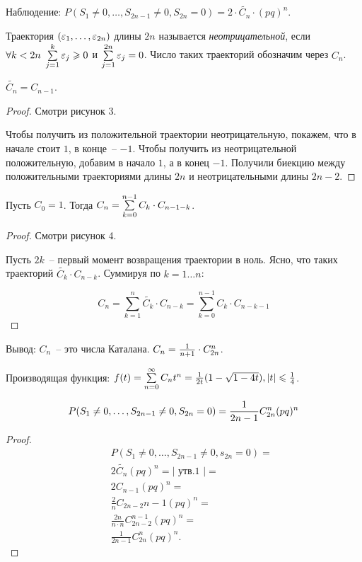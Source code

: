 \begin{statement}
Наблюдение: $P(S_1 \neq 0, \dots, S_{2n-1} \neq 0, S_{2n} = 0) = 2 \cdot \tilde{C_n} \cdot (pq)^n$. 
\end{statement}

\begin{definition}
Траектория $(\varepsilon_1, \dots, \varepsilon_{2n})$ длины $2n$ называется
\emph{неотрицательной}, если
$\forall k < 2n~\sum\limits_{j=1}^k \varepsilon_j \geqslant 0$ и $\sum\limits_{j=1}^{2n} \varepsilon_j = 0$.
Число таких траекторий обозначим через $C_n$.
\end{definition}

\begin{statement}
$\tilde{C_n} = C_{n-1}$.
\end{statement}
\begin{proof}
Смотри рисунок 3.

Чтобы получить из положительной траектории неотрицательную, покажем,
что в начале стоит $1$, в конце~-- $-1$. Чтобы получить из неотрицательной положительную,
добавим в начало $1$, а в конец $-1$. Получили биекцию между положительными траекториями длины $2n$
и неотрицательными длины $2n-2$.
\end{proof}

\begin{statement}
Пусть $C_0 = 1$. Тогда $C_n = \sum\limits_{k=0}^{n-1} C_k \cdot C_{n-1-k}$.
\end{statement}
\begin{proof}
Смотри рисунок 4.

Пусть $2k$~-- первый момент возвращения траектории в ноль.
Ясно, что таких траекторий $\tilde{C_k} \cdot C_{n-k}$. Суммируя по $k=1\dots n$:

$$C_n = \sum_{k=1}^n \tilde{C_k} \cdot C_{n-k} = \sum_{k=0}^{n-1} C_k \cdot C_{n-k-1}$$
\end{proof}

Вывод: $C_n$~-- это числа Каталана. $C_n =\frac{1}{n+1} \cdot C_{2n}^{n}$.

Производящая функция: $f(t) = \sum\limits_{n=0}^{\infty} C_n t^n = \frac{1}{2t}(1-\sqrt{1-4t}), |t| \leqslant \frac14$.

\begin{theorem}
$$P(S_1 \neq 0, \dots, S_{2n-1} \neq 0, S_{2n} = 0) = \frac{1}{2n-1}C_{2n}^{n}(pq)^n$$
\end{theorem}
\begin{proof}
\begin{eqnarray*}
&&P(S_1 \neq 0, \dots, S_{2n-1} \neq 0 , s_{2n} = 0) = \\
&&2\tilde{C_n} (pq)^n = \text{| утв.1 |} = \\
&&2 C_{n-1} (pq)^n = \\
&&\frac2n C_{2n-2}{n-1} (pq)^n = \\
&&\frac{2n}{n\cdot n} C_{2n-2}^{n-1}(pq)^n = \\
&&\frac{1}{2n-1}C_{2n}^{n}(pq)^n.
\end{eqnarray*}
\end{proof}

